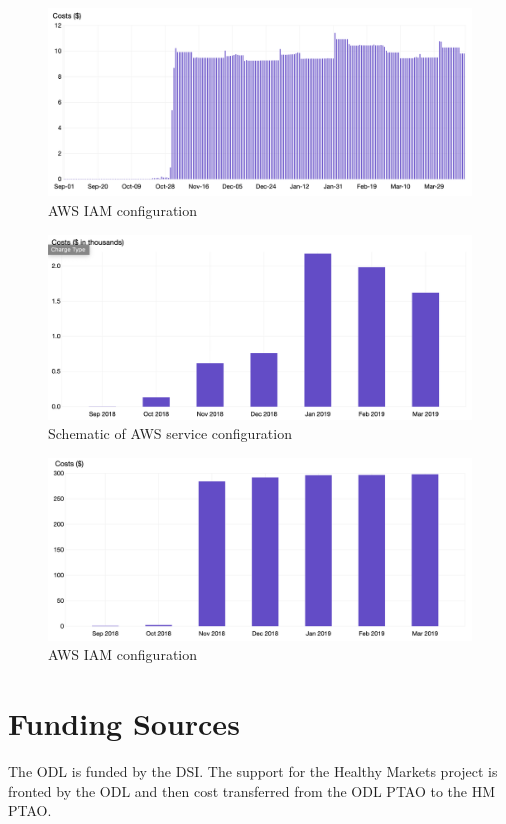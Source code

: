 \begin{figure}[!hbtp]
\includegraphics[width=\textwidth]{images/aws-metrics/throughmar/s3daily.png}
\caption{AWS IAM configuration\label{fg:iam}}
\end{figure}
\begin{figure}[!hbtp]
\includegraphics[width=\textwidth]{images/aws-metrics/throughmar/total.png}
\caption{Schematic of AWS service  configuration\label{fg:aws}}
\end{figure}
\begin{figure}[!hbtp]
\includegraphics[width=\textwidth]{images/aws-metrics/throughmar/s3.png}
\caption{AWS IAM configuration\label{fg:iam}}
\end{figure}

\section{Funding Sources}
The ODL is funded by the DSI. The support for the Healthy Markets project is fronted by the ODL and then  cost transferred from the ODL PTAO to the HM PTAO.



